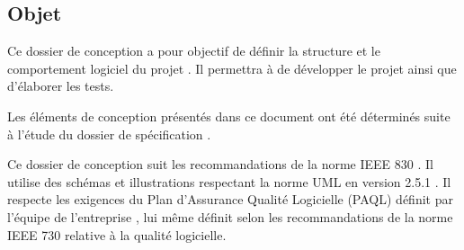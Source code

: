 \subsection{Objet} %

Ce dossier de conception a pour objectif de définir la structure et le comportement logiciel du
projet \projectName. Il permettra à \teamCompany de développer le projet ainsi que d'élaborer les tests. \newline

Les éléments de conception présentés dans ce document ont été déterminés suite à l’étude du
dossier de spécification \cite{SPEC}. \newline

Ce dossier de conception suit les recommandations de la norme IEEE 830 \cite{830}. Il
utilise des schémas et illustrations respectant la norme UML en version 2.5.1 \cite{UML}.
Il respecte les exigences du Plan d’Assurance Qualité Logicielle (PAQL) définit par l’équipe {\teamNumber}
\cite{PAQL} de l'entreprise \teamCompany, lui même définit selon les recommandations de la norme
IEEE 730 \cite{730} relative à la qualité logicielle.